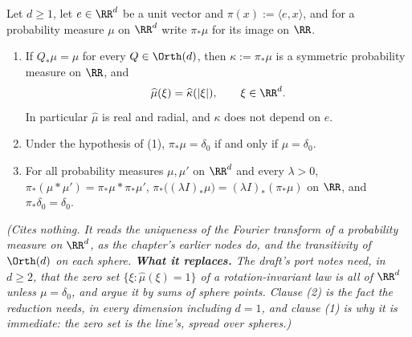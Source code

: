 \begin{lemma}
\label{lem:radial-marginal}
\leanok
Let $d \ge 1$, let $e \in \RR^d$ be a unit vector and $\pi(x) := \langle e, x\rangle$, and for a
probability measure $\mu$ on $\RR^d$ write $\pi_*\mu$ for its image on $\RR$.
\begin{enumerate}
\item If $Q_*\mu = \mu$ for every $Q \in \Orth(d)$, then $\kappa := \pi_*\mu$ is a symmetric
probability measure on $\RR$, and
\[
  \widehat\mu(\xi) = \widehat\kappa(|\xi|), \qquad \xi \in \RR^d .
\]
In particular $\widehat\mu$ is real and radial, and $\kappa$ does not depend on $e$.
\item Under the hypothesis of (1), $\pi_*\mu = \delta_0$ if and only if $\mu = \delta_0$.
\item For all probability measures $\mu, \mu'$ on $\RR^d$ and every $\lambda > 0$,
$\pi_*(\mu * \mu') = \pi_*\mu * \pi_*\mu'$, $\pi_*\bigl((\lambda I)_*\mu\bigr) =
(\lambda I)_*(\pi_*\mu)$ on $\RR$, and $\pi_*\delta_0 = \delta_0$.
\end{enumerate}
\statusT\quad\emph{(Cites nothing. It reads the uniqueness of the Fourier transform of a probability
measure on $\RR^d$, as the chapter's earlier nodes do, and the transitivity of $\Orth(d)$ on each
sphere. \textbf{What it replaces.} The draft's port notes need, in $d \ge 2$, that the zero set
$\{\xi : \widehat\mu(\xi) = 1\}$ of a rotation-invariant law is all of $\RR^d$ unless
$\mu = \delta_0$, and argue it by sums of sphere points. Clause (2) is the fact the reduction needs,
in every dimension including $d = 1$, and clause (1) is why it is immediate: the zero set is the
line's, spread over spheres.)}
\end{lemma}

